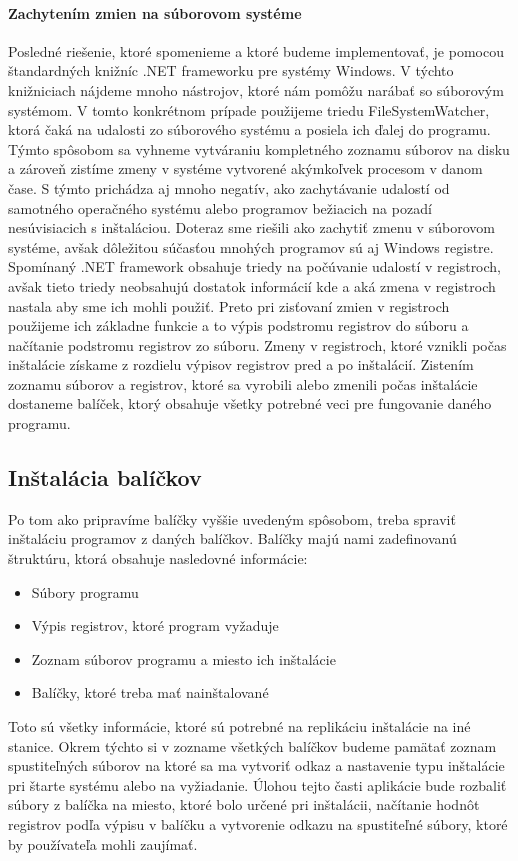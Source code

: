 \paragraph{Zachytením zmien na súborovom systéme}
Posledné riešenie, ktoré spomenieme a ktoré budeme implementovať, je pomocou štandardných knižníc .NET frameworku pre systémy Windows. V týchto knižniciach nájdeme mnoho nástrojov, ktoré nám pomôžu narábať so súborovým systémom. V tomto konkrétnom prípade použijeme triedu FileSystemWatcher, ktorá čaká na udalosti zo súborového systému a posiela ich ďalej do programu. Týmto spôsobom sa vyhneme vytváraniu kompletného zoznamu súborov na disku a zároveň zistíme zmeny v systéme vytvorené akýmkoľvek procesom v danom čase. S týmto prichádza aj mnoho negatív, ako zachytávanie udalostí od samotného operačného systému alebo programov bežiacich na pozadí nesúvisiacich s inštaláciou. Doteraz sme riešili ako zachytiť zmenu v súborovom systéme, avšak dôležitou súčasťou mnohých programov sú aj Windows registre. Spomínaný .NET framework obsahuje triedy na počúvanie udalostí v registroch, avšak tieto triedy neobsahujú dostatok informácií kde a aká zmena v registroch nastala aby sme ich mohli použiť. Preto pri zisťovaní zmien v registroch použijeme ich základne funkcie a to výpis podstromu  registrov do súboru a načítanie podstromu registrov zo súboru. Zmeny v registroch, ktoré vznikli počas inštalácie získame z rozdielu výpisov registrov pred a po inštalácií. Zistením zoznamu súborov a registrov, ktoré sa vyrobili alebo zmenili počas inštalácie dostaneme balíček, ktorý obsahuje všetky potrebné veci pre fungovanie daného programu.

\subsection{Inštalácia balíčkov}
Po tom ako pripravíme balíčky vyššie uvedeným spôsobom, treba spraviť inštaláciu programov z daných balíčkov. Balíčky majú nami zadefinovanú štruktúru, ktorá obsahuje nasledovné informácie:

\begin{itemize}
\item Súbory programu
\item Výpis registrov, ktoré program vyžaduje
\item Zoznam súborov programu a miesto ich inštalácie
\item Balíčky, ktoré treba mať nainštalované
\end{itemize}

Toto sú všetky informácie, ktoré sú potrebné na replikáciu inštalácie na iné stanice. Okrem týchto si v zozname všetkých balíčkov budeme pamätať zoznam spustiteľných súborov na ktoré sa ma vytvoriť odkaz a nastavenie typu inštalácie pri štarte systému alebo na vyžiadanie. Úlohou tejto časti aplikácie bude rozbaliť súbory z balíčka na miesto, ktoré bolo určené pri inštalácii, načítanie hodnôt registrov podľa výpisu v balíčku a vytvorenie odkazu na spustiteľné súbory, ktoré by používateľa mohli zaujímať.

